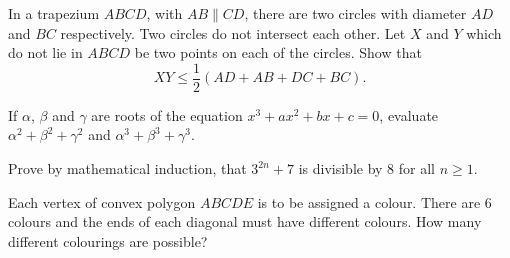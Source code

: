 \begin{problems}
    \problem In a trapezium $ABCD$, with $AB \parallel CD$, there are two
    circles with diameter $AD$ and $BC$ respectively. Two circles do not
    intersect each other. Let $X$ and $Y$ which do not lie in $ABCD$ be two
    points on each of the circles. Show that 
    \[XY \leq \frac{1}{2}(AD + AB + DC + BC).\]
    
    \problem If $\alpha$, $\beta$ and $\gamma$ are roots of the equation $x^3 +
    ax^2 + bx + c = 0$, evaluate $\alpha^2 + \beta^2 + \gamma^2$ and $\alpha^3
    + \beta^3 + \gamma^3$. 
    
    \problem Prove by mathematical induction, that $3^{2n} + 7$ is divisible by
    8 for all $n \geq 1$. 
    
    \problem Each vertex of convex polygon $ABCDE$ is to be assigned a colour.
    There are 6 colours and the ends of each diagonal must have different
    colours. How many different colourings are possible?
\end{problems}

